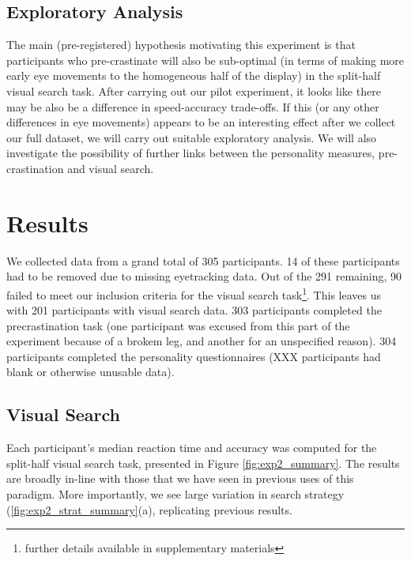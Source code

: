 \documentclass[]{rsos}
\begin{document}
\subsection{Exploratory Analysis}

The main (pre-registered) hypothesis motivating this experiment is that participants who pre-crastinate will also be sub-optimal (in terms of making more early eye movements to the homogeneous half of the display) in the split-half visual search task. After carrying out our pilot experiment, it looks like there may be also be a difference in speed-accuracy trade-offs. If this (or any other differences in eye movements) appears to be an interesting effect after we collect our full dataset, we will carry out suitable exploratory analysis. We will also investigate the possibility of further links between the personality measures, pre-crastination and visual search. 

\section{Results}

We collected data from a grand total of 305 participants. 14 of these participants had to be removed due to missing eyetracking data. Out of the 291 remaining, 90 failed to meet our inclusion criteria for the visual search task\footnote{further details available in supplementary materials}. This leaves us with 201 participants with visual search data. 303 participants completed the precrastination task (one participant was excused from this part of the experiment because of a brokem leg, and another for an unspecified reason). 304 participants completed the personality questionnaires (XXX participants had blank or otherwise unusable data).

\subsection{Visual Search}

Each participant’s median reaction time and accuracy was computed for the split-half visual
search task, presented in Figure \ref{fig:exp2_summary}. The results are broadly in-line with those that we have seen in previous uses of this paradigm. More importantly, we see large variation in search strategy (\ref{fig:exp2_strat_summary}(a), replicating previous results.  
\end{document}
